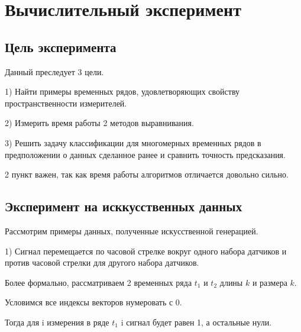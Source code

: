 \documentclass[12pt, twoside]{article}
\begin{document}











\section{Вычислительный эксперимент}

\subsection{Цель эксперимента}

Данный преследует 3 цели.

1) Найти примеры временных рядов, удовлетворяющих свойству пространственности измерителей.

2) Измерить время работы 2 методов выравнивания.

3) Решить задачу классификации для многомерных временных рядов в предположении о данных сделанное ранее и сравнить точность предсказания.

2 пункт важен, так как время работы алгоритмов отличается довольно сильно.

\subsection{Эксперимент на исккусственных данных}


Рассмотрим примеры данных, полученные искусственной генерацией.

1) Сигнал перемещается по часовой стрелке вокруг одного набора датчиков и против часовой стрелки для другого набора датчиков.

Более формально, рассматриваем 2 временных ряда $t_1$  и $t_2$ длины $k$ и размера $k$.

Условимся все индексы векторов нумеровать с 0.

Тогда для i измерения в ряде $t_1$ i сигнал будет равен 1, а остальные нули.
\end{document}
